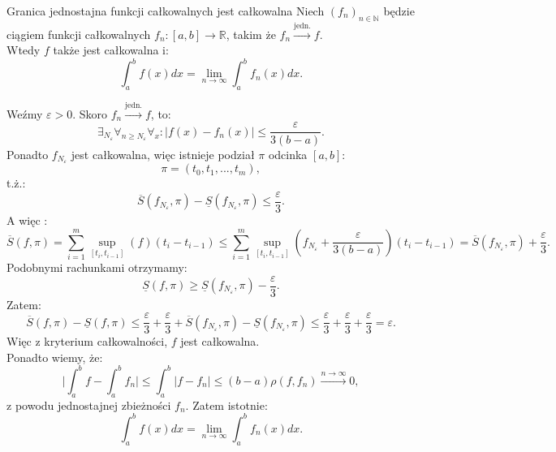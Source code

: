 \documentclass{article}
\numberwithin{defi}{section}
\numberwithin{defi}{section}
\newcommand{\R}{\mathbb{R}}
\newcommand{\N}{\mathbb{N}}
\newcommand{\oo}{\infty}
\newcommand{\Sd}{\underline{S}}
\newcommand{\Sg}{\overline{S}}
\newcommand{\przedz}[2]{[#1 _ {#2}, #1_{#2 - 1}]}
\providecommand{\eps}{\varepsilon}
\renewcommand{\geq}{\geqslant}
\renewcommand{\leq}{\leqslant}
\newcommand{\ciag}[1]{(#1_{n})_{n \in \N}}
\newcommand{\tojedn}{\xrightarrow{\text{jedn.}}}
\begin{document}
\begin{twier}{Granica jednostajna funkcji całkowalnych jest całkowalna}
    Niech $\ciag{f}$ będzie ciągiem funkcji całkowalnych $f_n: [a, b] \to \R$, takim że $f_n \tojedn f$. \\ 
    Wtedy $f$ także jest całkowalna i: \begin{equation}
        \int_{a}^{b} f(x) dx = \lim_{n \to \oo} \int_{a}^{b} f_n(x) dx. 
    \end{equation} 
\end{twier}


\begin{dow}{}
    Weźmy $\eps > 0$. Skoro $f_n \tojedn f$, to: \begin{equation*}
        \exists_{N_\eps} \forall_{n \geq N_\eps} \forall_{x}: |f(x) - f_n(x)| \leq \frac{\eps}{3(b -a )}.
    \end{equation*} Ponadto $f_{N_\eps}$ jest całkowalna, więc istnieje podział $\pi$ odcinka $[a, b]$: \begin{equation*}
        \pi = (t_0, t_1, ..., t_m),
    \end{equation*} t.ż.: \begin{equation*}
        \Sg(f_{N_\eps}, \pi) - \Sd(f_{N_\eps}, \pi) \leq \frac{\eps}{3}.
    \end{equation*} A więc : \begin{equation*}
        \Sg(f, \pi) = \sum_{i = 1}^{m} \sup_{\przedz{t}{i}} (f) (t_i - t_{i-1}) \leq  \sum_{i = 1}^{m} \sup_{\przedz{t}{i}} (f_{N_\eps} + \frac{\eps}{3(b -a )}) (t_i - t_{i-1}) = \Sg(f_{N_\eps}, \pi) + \frac{\eps}{3}.
    \end{equation*}Podobnymi rachunkami otrzymamy: \begin{equation*}
        \Sd(f, \pi) \geq \Sd(f_{N_\eps}, \pi) - \frac{\eps}{3}.
    \end{equation*} Zatem: \begin{equation*}
        \Sg(f, \pi) - \Sd(f, \pi) \leq \frac{\eps}{3} + \frac{\eps}{3} + \Sg(f_{N_\eps}, \pi) - \Sd(f_{N_\eps}, \pi) \leq \frac{\eps}{3} + \frac{\eps}{3} + \frac{\eps}{3} = \eps.
    \end{equation*} Więc z kryterium całkowalności, $f$ jest całkowalna.\\
    Ponadto wiemy, że: \begin{equation*}
        \big| \int_{a}^{b} f - \int_{a}^{b} f_n \big| \leq  \int_{a}^{b} |f - f_n| \leq (b - a) \rho(f, f_n) \xrightarrow{n \to \oo} 0,
    \end{equation*} z powodu jednostajnej zbieżności $f_n$. Zatem istotnie: \begin{equation*}
        \int_{a}^{b} f(x) dx = \lim_{n \to \oo} \int_{a}^{b} f_n(x) dx. 
    \end{equation*}
\end{dow}
\end{document}
